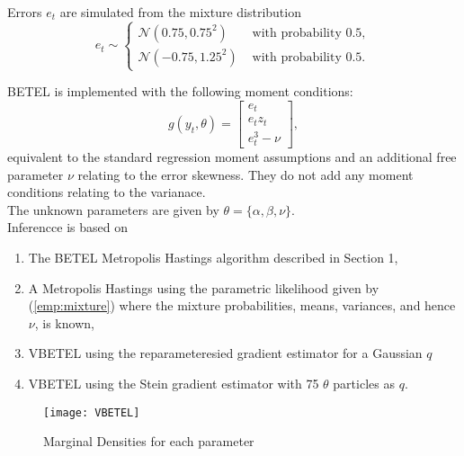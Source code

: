 \documentclass[12pt,a4paper]{article}\usepackage[]{graphicx}\usepackage[]{color}
\begin{document}
Errors $e_t$ are simulated from the mixture distribution
\begin{equation}
\label{emp:mixture}
e_t \sim \left\{ \begin{array}{cr} \mathcal{N}(0.75, 0.75^2) & \mbox{ with probability } 0.5, \\
\mathcal{N}(-0.75, 1.25^2) & \mbox{  with probability } 0.5. \end{array} \right. 
\end{equation}

BETEL is implemented with the following moment conditions:
\begin{equation}
g(y_t, \theta) = \left[\begin{array}{c} e_t \\ e_t z_t \\ e_t^3 - \nu \end{array}\right],
\end{equation}
equivalent to the standard regression moment assumptions and an additional free parameter $\nu$ relating to the error skewness. They do not add any moment conditions relating to the varianace.
\\

The unknown parameters are given by $\theta = \{\alpha, \beta, \nu \}$.
\\

Inferencce is based on 
\begin{enumerate}
\item The BETEL Metropolis Hastings algorithm described in Section 1, 
\item A Metropolis Hastings using the parametric likelihood given by (\ref{emp:mixture}) where the mixture probabilities, means, variances, and hence $\nu$, is known,
\item VBETEL using the reparameteresied gradient estimator for a Gaussian $q$ 
\item VBETEL using the Stein gradient estimator with 75 $\theta$ particles as $q$.
\end{enumerate}

\begin{figure}[hbtp]
\centering
\texttt{[image: VBETEL]}
\caption{Marginal Densities for each parameter}
\end{figure}




\end{document}
